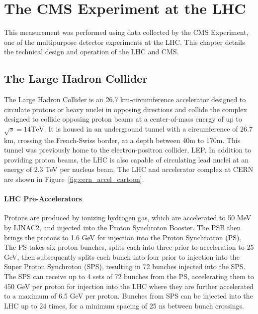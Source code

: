 \chapter{The CMS Experiment at the LHC}\label{ch:exp}
This measurement was performed using data collected by the CMS Experiment, one of the multipurpose detector experiments at the LHC. This chapter details the technical design and operation of the LHC and CMS. 


\section{The Large Hadron Collider}
The Large Hadron Collider is an 26.7 km-circumference accelerator designed to circulate protons or heavy nuclei in opposing directions and collide the complex designed to collide opposing proton beams at a center-of-mass energy of up to $\sqrt{s}=14\mathrm{TeV}$. It is housed in an underground tunnel with a circumference of 26.7 km, crossing the French-Swiss border, at a depth between 40m to 170m. This tunnel was previously home to the electron-positron collider, LEP. In addition to providing proton beams, the LHC is also capable of circulating lead nuclei at an energy of 2.3 TeV per nucleus beam. The LHC and accelerator complex at CERN are shown in Figure~\ref{fig:cern_accel_cartoon}.



\subsubsection{LHC Pre-Accelerators}
Protons are produced by ionizing hydrogen gas, which are accelerated to 50 MeV by LINAC2, and injected into the Proton Synchroton Booster. The PSB then brings the protons to 1.6 GeV for injection into the Proton Synchrotron (PS). The PS takes six proton bunches, splits each into three prior to acceleration to 25 GeV, then subsequently splits each bunch into four prior to injection into the Super Proton Synchroton (SPS), resulting in 72 bunches injected into the SPS. The SPS can receive up to 4 sets of 72 bunches from the PS, accelerating them to 450 GeV per proton for injection into the LHC where they are further accelerated to a maximum of 6.5 GeV per proton. Bunches from SPS can be injected into the LHC up to 24 times, for a minimum spacing of 25 ns between bunch crossings\cite{Benedikt:2004wm}. 

